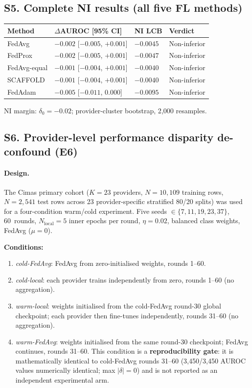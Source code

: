 \subsection*{S5. Complete NI results (all five FL methods)}

\begin{tabular}{@{}llll@{}}
\hline
Method & $\Delta$AUROC [95\% CI] & NI LCB & Verdict \\
\hline
FedAvg       & $-0.002$ [$-0.005$, $+0.001$] & $-0.0045$ & Non-inferior \\
FedProx      & $-0.002$ [$-0.005$, $+0.001$] & $-0.0047$ & Non-inferior \\
FedAvg-equal & $-0.001$ [$-0.004$, $+0.001$] & $-0.0040$ & Non-inferior \\
SCAFFOLD     & $-0.001$ [$-0.004$, $+0.001$] & $-0.0040$ & Non-inferior \\
FedAdam      & $-0.005$ [$-0.011$, $0.000$]  & $-0.0095$ & Non-inferior \\
\hline
\end{tabular}

NI margin: $\delta_0=-0.02$; provider-cluster bootstrap, 2{,}000 resamples.

\subsection*{S6. Provider-level performance disparity de-confound (E6)}

\paragraph{Design.}
The Cimas primary cohort ($K=23$ providers, $N=10{,}109$ training rows,
$N=2{,}541$ test rows across 23 provider-specific stratified 80/20 splits)
was used for a four-condition warm/cold experiment.
Five seeds $\in\{7,11,19,23,37\}$, 60~rounds, $N_\text{local}=5$
inner epochs per round, $\eta=0.02$, balanced class weights, FedAvg ($\mu=0$).

\noindent\textbf{Conditions:}
\begin{enumerate}
  \item \emph{cold-FedAvg}: FedAvg from zero-initialised weights, rounds 1--60.
  \item \emph{cold-local}: each provider trains independently from zero,
    rounds 1--60 (no aggregation).
  \item \emph{warm-local}: weights initialised from the cold-FedAvg round-30
    global checkpoint; each provider then fine-tunes independently,
    rounds 31--60 (no aggregation).
  \item \emph{warm-FedAvg}: weights initialised from the same round-30
    checkpoint; FedAvg continues, rounds 31--60.
    This condition is a \textbf{reproducibility gate}: it is mathematically
    identical to cold-FedAvg rounds 31--60 (3,450/3,450 AUROC values
    numerically identical; max $|\delta|=0$) and is not reported as an
    independent experimental arm.
\end{enumerate}

